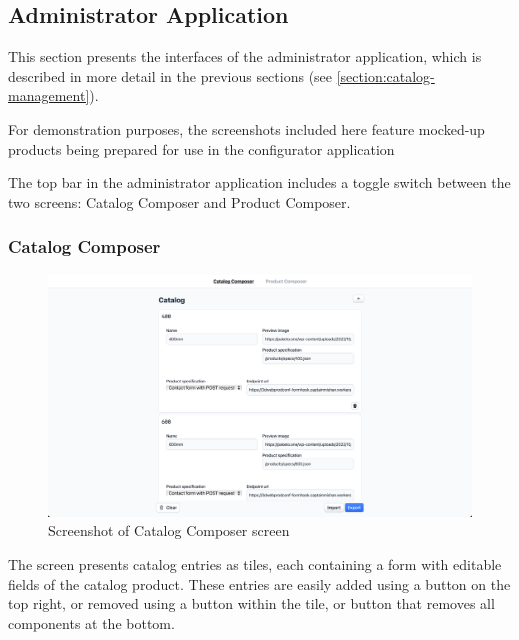 \subsection{Administrator Application}

This section presents the interfaces of the administrator application, which is described in more detail in the previous sections (see \autoref{section:catalog-management}).

For demonstration purposes, the screenshots included here feature mocked-up products being prepared for use in the configurator application

The top bar in the administrator application includes a toggle switch between the two screens: Catalog Composer and Product Composer.


\subsubsection{Catalog Composer}

\begin{figure}[h!]
\centering
\includegraphics[width=\textwidth]{images/screenshot_catalogcomposer.png}
\caption{Screenshot of Catalog Composer screen}
\label{fig:screenshot-catalogcomposer}
\end{figure}


The screen presents catalog entries as tiles, each containing a form with editable fields of the catalog product. These entries are easily added using a button on the top right, or removed using a button within the tile, or button that removes all components at the bottom.

